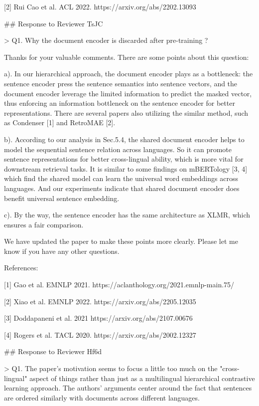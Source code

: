 [2] Rui Cao et al. ACL 2022. https://arxiv.org/abs/2202.13093



## Response to Reviewer TsJC

> Q1. Why the document encoder is discarded after pre-training ?

Thanks for your valuable comments. There are some points about this question:

a). In our hierarchical approach, the document encoder plays as a bottleneck: the sentence encoder press the sentence semantics into sentence vectors, and the document encoder leverage the limited information to predict the masked vector, thus enforcing an information bottleneck on the sentence encoder for better representations. There are several papers also utilizing the similar method, such as Condenser [1] and RetroMAE [2].

b). According to our analysis in Sec.5.4, the shared document encoder helps to model the sequential sentence relation across languages. So it can promote sentence representations for better cross-lingual ability, which is more vital for downstream retrieval tasks. It is similar to some findings on mBERTology [3, 4] which find the shared model can learn the universal word embeddings across languages. And our experiments indicate that shared document encoder does benefit universal sentence embedding. 

c). By the way, the sentence encoder has the same architecture as XLMR, which ensures a fair comparison. 



We have updated the paper to make these points more clearly. Please let me know if you have any other questions.



References:

[1] Gao et al. EMNLP 2021. https://aclanthology.org/2021.emnlp-main.75/

[2] Xiao et al. EMNLP 2022. https://arxiv.org/abs/2205.12035

[3] Doddapaneni et al. 2021 https://arxiv.org/abs/2107.00676

[4] Rogers et al. TACL 2020. https://arxiv.org/abs/2002.12327



## Response to Reviewer Hf6d

> Q1. The paper's motivation seems to focus a little too much on the "cross-lingual" aspect of things rather than just as a multilingual hierarchical contrastive learning approach. The authors' arguments center around the fact that sentences are ordered similarly with documents across different languages.

